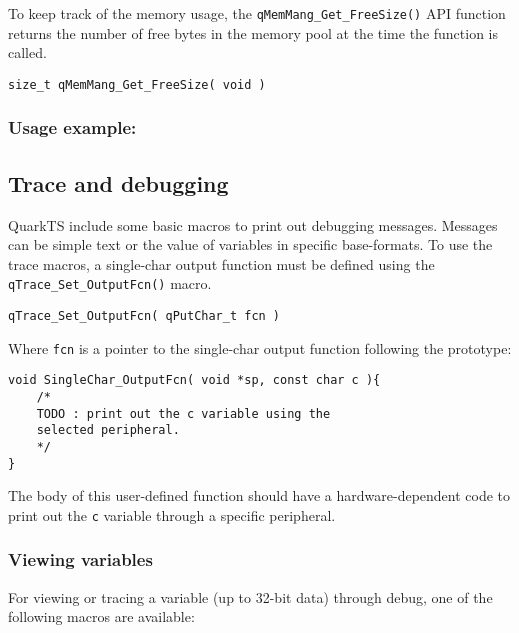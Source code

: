 To keep track of the memory usage, the \lstinline{qMemMang_Get_FreeSize()}  API function returns the number of free bytes in the memory pool at the time the function is called.
\medskip

\begin{lstlisting}[style=CStyle]
size_t qMemMang_Get_FreeSize( void )
\end{lstlisting}

\subsubsection*{Usage example:}



\subsection{Trace and debugging}
QuarkTS include some basic macros to print out debugging messages. Messages can be simple text or the value of variables in specific base-formats. 
To use the trace macros, a single-char output function must be defined using the \lstinline{qTrace_Set_OutputFcn()} macro.
\medskip

\begin{lstlisting}[style=CStyle]
qTrace_Set_OutputFcn( qPutChar_t fcn )
\end{lstlisting}

Where \lstinline{fcn} is a pointer to the single-char output function following the prototype:
\medskip

\begin{lstlisting}[style=CStyle]
void SingleChar_OutputFcn( void *sp, const char c ){
    /*
    TODO : print out the c variable using the
    selected peripheral.
    */
}
\end{lstlisting}

The body of this user-defined function should have a hardware-dependent code to print out the \lstinline{c} variable through a specific peripheral.

\subsubsection{Viewing variables}
For viewing or tracing a variable (up to 32-bit data) through debug, one of the following macros are available:
   
\medskip

